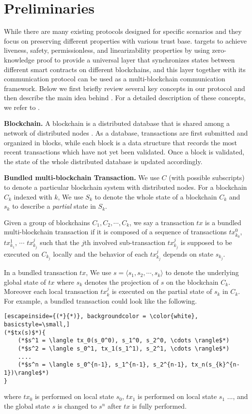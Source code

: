 \section{Preliminaries}
\label{prelimiary}
While there are many existing protocols designed for specific scenarios and they focus on preserving different properties with various trust base. \dprotocol targets to achieve liveness, safety, permissionless, and linearizability properties by using zero-knowledge proof to provide a universal layer that synchronizes states between different smart contracts on different blockchains, and this layer together with its communication protocol can be used as a multi-blockchain communication framework. Below we first briefly review several key concepts in our protocol and then describe the main idea behind \dprotocol. For a detailed description of these concepts, we refer to \cite{robinson2021survey}. 

\smallskip\noindent\textbf{Blockchain.}
A blockchain is a distributed database that is shared among a network of distributed nodes \cite{chen2018survey}. As a database, transactions are first submitted and organized in blocks, while each block is a data structure that records the most recent transactions which have not yet been validated. Once a block is validated, the state of the whole distributed database is updated accordingly.

\smallskip\noindent\textbf{Bundled multi-blockchain Transaction.}
We use $C$ (with possible subscripts) to denote a particular blockchain system with distributed nodes. For a blockchain $C_k$ indexed with $k$, We use $S_k$ to denote the whole state of a blockchain $C_{k}$ and $s_k$ to describe a \emph{partial} state in $S_k$.

Given a group of blockchains $C_{1}, C_{2}, \cdots, C_{k}$, we say a transaction $tx$ is a bundled multi-blockchain transaction if it is composed of a sequence of transactions $tx_{k_0}^0$, $tx_{k_1}^1$, $\cdots$ $tx_{k_j}^j$ such that the $j$th involved sub-transaction $tx_{k_j}^j$ is supposed to be executed on $C_{k_j}$ locally and the behavior of each $tx_{k_j}^{j}$ depends on state $s_{k_j}$. 

In a bundled transaction $tx$, We use $s= \langle s_1, s_2, \cdots, s_k \rangle$ to denote the underlying global state of $tx$ where $s_k$ denotes the projection of $s$ on the blockchain $C_k$. Moreover each local transaction $tx_k^j$ is executed on the partial state of $s_k$ in $C_k$. For example, a bundled transaction could look like the following. 
\begin{lstlisting}[escapeinside={(*}{*)}, backgroundcolor = \color{white}, basicstyle=\small,]
(*$tx(s)$*){
    (*$s^1 = \langle tx_0(s_0^0), s_1^0, s_2^0, \cdots \rangle$*)
    (*$s^2 = \langle s_0^1, tx_1(s_1^1), s_2^1, \cdots \rangle$*)
    ....
    (*$s^n = \langle s_0^{n-1}, s_1^{n-1}, s_2^{n-1}, tx_n(s_{k}^{n-1})\rangle$*)
}
\end{lstlisting}
where $tx_0$ is performed on local state $s_0$, $tx_1$ is performed on local state $s_1$ ..., and the global state $s$ is changed to $s^n$ after $tx$ is fully performed.

